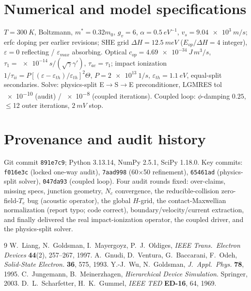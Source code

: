 \documentclass[11pt]{article}
\newcommand{\eps}{\varepsilon}
\begin{document}
\appendix
\section{Numerical and model specifications}\label{sec:specs}
$T=\SI{300}{K}$, Boltzmann, $m^*=0.32m_0$, $g_v=6$, $\alpha=\SI{0.5}{eV^{-1}}$, $v_s=\SI{9.04e3}
{m/s}$; erfc doping per earlier revisions; SHE grid $\Delta H=\SI{12.5}{meV}$ ($E_{op}/\Delta H=4$
integer), $\eps=0$ reflecting / $\eps_{max}$ absorbing. Optical $c_{op}=\SI{4.69e-34}{J\,m^3/s}$,
$\tau_1=\SI{e-14}{s}/(\sqrt\gamma\gamma')$, $\tau_{ac}=\tau_1$; impact ionization
$1/\tau_{ii}=P[(\eps-\eps_{th})/\eps_{th}]^2\Theta$, $P=\SI{2e13}{1/s}$, $\eps_{th}=\SI{1.1}{eV}$,
equal-split secondaries. Solve: physics-split E$\to$S$\to$E preconditioner, LGMRES tol
\SI{e-10}{} (audit) / \SI{e-8}{} (coupled iterations). Coupled loop: $\phi$-damping $0.25$,
$\le$12 outer iterations, $\SI{2}{mV}$ stop.

\section{Provenance and audit history}\label{sec:history}
Git commit \texttt{891e7c9}; Python 3.13.14, NumPy 2.5.1, SciPy 1.18.0. Key commits:
\texttt{f016e3c} (locked one-way audit), \texttt{7aad998} (60$\times$50 refinement),
\texttt{65461ad} (physics-split solver), \texttt{047da93} (coupled loop). Four audit rounds fixed:
over-claims, missing specs, junction geometry, $N_c$ convergence, the reducible-collision
zero-field-$T_e$ bug (acoustic operator), the global $H$-grid, the contact-Maxwellian
normalization (report typo; code correct), boundary/velocity/current extraction, and finally
delivered the real impact-ionization operator, the coupled driver, and the physics-split solver.

\begin{thebibliography}{9}\small
{} W.~Liang, N.~Goldsman, I.~Mayergoyz, P.~J.~Oldiges, \emph{IEEE Trans.\ Electron
Devices} \textbf{44}(2), 257--267, 1997.
 A.~Gnudi, D.~Ventura, G.~Baccarani, F.~Odeh, \emph{Solid-State Electron.}
\textbf{36}, 575, 1993.
 Y.-J.~Wu, N.~Goldsman, \emph{J.\ Appl.\ Phys.} \textbf{78}, 1995.
 C.~Jungemann, B.~Meinerzhagen, \emph{Hierarchical Device Simulation}.
Springer, 2003.
 D.~L.~Scharfetter, H.~K.~Gummel, \emph{IEEE TED} \textbf{ED-16}, 64, 1969.
\end{thebibliography}
\end{document}
